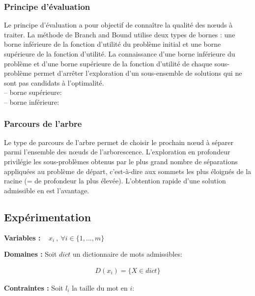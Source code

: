 \documentclass[11pt, letterpaper]{article}
\begin{document}
\subsubsection*{Principe d'\'{e}valuation}

Le principe d'\'{e}valuation a pour objectif de conna\^{i}tre la qualit\'{e} des n\oe{}uds \`{a} traiter. La m\'{e}thode de \og Branch and Bound \fg{} utilise deux types de bornes : une borne inf\'{e}rieure de la fonction d'utilit\'{e} du probl\`{e}me initial et une borne sup\'{e}rieure de la fonction d'utilit\'{e}. La connaissance d'une borne inf\'{e}rieure du probl\`{e}me et d'une borne sup\'{e}rieure de la fonction d'utilit\'{e} de chaque sous-probl\`{e}me permet d'arr\^{e}ter  l'exploration d'un sous-ensemble de
solutions qui ne sont pas candidats \`{a} l'optimalit\'{e}.\\
-- borne sup\'{e}rieure:\\
-- borne inf\'{e}rieure:

\subsubsection*{Parcours de l'arbre}

Le type de parcours de l'arbre permet de choisir le prochain n\oe{}ud \`{a} s\'{e}parer parmi l'ensemble des n\oe{}uds de l'arborescence. L'exploration en profondeur privil\'{e}gie les sous-probl\`{e}mes obtenus par le plus grand nombre de s\'{e}parations appliqu\'{e}es au probl\`{e}me de d\'{e}part, c'est-\`{a}-dire aux sommets les plus \'{e}loign\'{e}s de la racine (= de profondeur la plus \'{e}lev\'{e}e). L'obtention rapide d'une solution admissible en est l'avantage.

\subsection{Exp\'{e}rimentation}

\newpage

\textbf{Variables :} ~ $x_{i}~,~\forall i \in \{1,...,m\}$

\bigskip

\textbf{Domaines :} Soit $dict$ un dictionnaire de mots admissibles:

\begin{align*}
D(x_{i}) = \{ X \in dict \}
\end{align*}

\bigskip

\textbf{Contraintes :} Soit $l_{i}$ la taille du mot en $i$:
\end{document}
